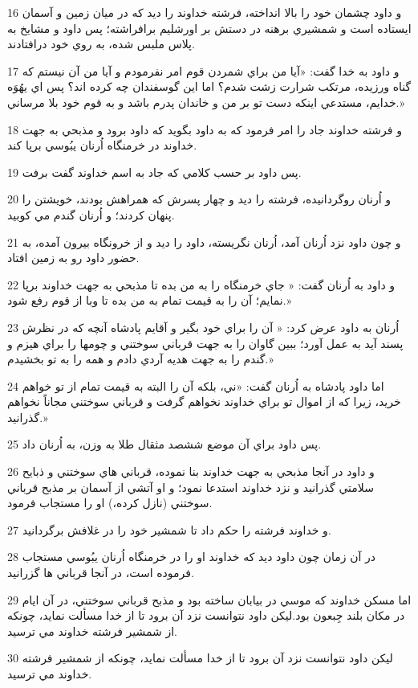 \par 16 و داود چشمان خود را بالا انداخته، فرشته خداوند را ديد که در ميان زمين و آسمان ايستاده است و شمشيري برهنه در دستش بر اورشليم برافراشته؛ پس داود و مشايخ به پلاس ملبس شده، به روي خود درافتادند.
\par 17 و داود به خدا گفت: «آيا من براي شمردن قوم امر نفرمودم و آيا من آن نيستم که گناه ورزيده، مرتکب شرارت زشت شدم؟ اما اين گوسفندان چه کرده اند؟ پس اي يهُوَه خدايم، مستدعي اينکه دست تو بر من و خاندان پدرم باشد و به قوم خود بلا مرساني.»
\par 18 و فرشته خداوند جاد را امر فرمود که به داود بگويد که داود برود و مذبحي به جهت خداوند در خرمنگاه اُرنان يبُوسي برپا کند. 
\par 19 پس داود بر حسب کلامي که جاد به اسم خداوند گفت برفت.
\par 20 و اُرنان روگردانيده، فرشته را ديد و چهار پسرش که همراهش بودند، خويشتن را پنهان کردند؛ و اُرنان گندم مي کوبيد.
\par 21 و چون داود نزد اُرنان آمد، اُرنان نگريسته، داود را ديد و از خرونگاه بيرون آمده، به حضور داود رو به زمين افتاد.
\par 22 و داود به اُرنان گفت: « جاي خرمنگاه را به من بده تا مذبحي به جهت خداوند برپا نمايم؛ آن را به قيمت تمام به من بده تا وبا از قوم رفع شود.»
\par 23 اُرنان به داود عرض کرد: « آن را براي خود بگير و آقايم پادشاه آنچه که در نظرش پسند آيد به عمل آورد؛ ببين گاوان را به جهت قرباني سوختني و چومها را براي هيزم و گندم را به جهت هديه آردي دادم و همه را به تو بخشيدم.»
\par 24 اما داود پادشاه به اُرنان گفت: «ني، بلکه آن را البته به قيمت تمام از تو خواهم خريد، زيرا که از اموال تو براي خداوند نخواهم گرفت و قرباني سوختني مجاناً نخواهم گذرانيد.»
\par 25 پس داود براي آن موضع ششصد مثقال طلا به وزن، به اُرنان داد.
\par 26 و داود در آنجا مذبحي به جهت خداوند بنا نموده، قرباني هاي سوختني و ذبايح سلامتي گذرانيد و نزد خداوند استدعا نمود؛ و او آتشي از آسمان بر مذبح قرباني سوختني (نازل کرده،) او را مستجاب فرمود.
\par 27 و خداوند فرشته را حکم داد تا شمشير خود را در غلافش برگردانيد.
\par 28 در آن زمان چون داود ديد که خداوند او را در خرمنگاه اُرنان يبُوسي مستجاب فرموده است، در آنجا قرباني ها گزرانيد.
\par 29 اما مسکن خداوند که موسي در بيابان ساخته بود و مذبح قرباني سوختني، در آن ايام در مکان بلند جِبعون بود.ليکن داود نتوانست نزد آن برود تا از خدا مسألت نمايد، چونکه از شمشير فرشته خداوند مي ترسيد.
\par 30 ليکن داود نتوانست نزد آن برود تا از خدا مسألت نمايد، چونکه از شمشير فرشته خداوند مي ترسيد.
 
